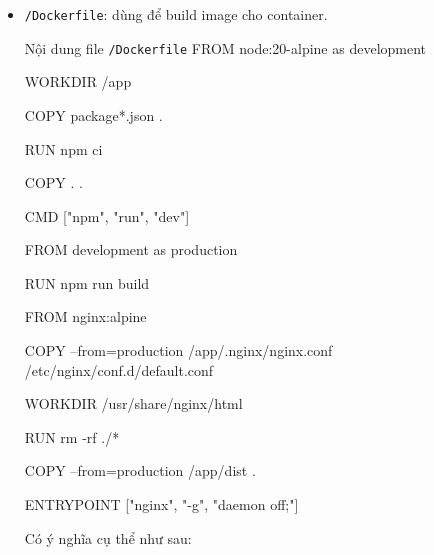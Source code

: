 \begin{itemize}[label={--}]
  \item \texttt{/Dockerfile}: dùng để build image cho container.\\
        \begin{coding}[gobble=10]{Nội dung file \texttt{/Dockerfile}}
          FROM node:20-alpine as development

          WORKDIR /app

          COPY package*.json .

          RUN npm ci

          COPY . .

          CMD ["npm", "run", "dev"]

          FROM development as production

          RUN npm run build

          FROM nginx:alpine

          COPY --from=production /app/.nginx/nginx.conf /etc/nginx/conf.d/default.conf

          WORKDIR /usr/share/nginx/html

          RUN rm -rf ./*

          COPY --from=production /app/dist .

          ENTRYPOINT ["nginx", "-g", "daemon off;"]
        \end{coding}

        Có ý nghĩa cụ thể như sau:


\end{itemize}
